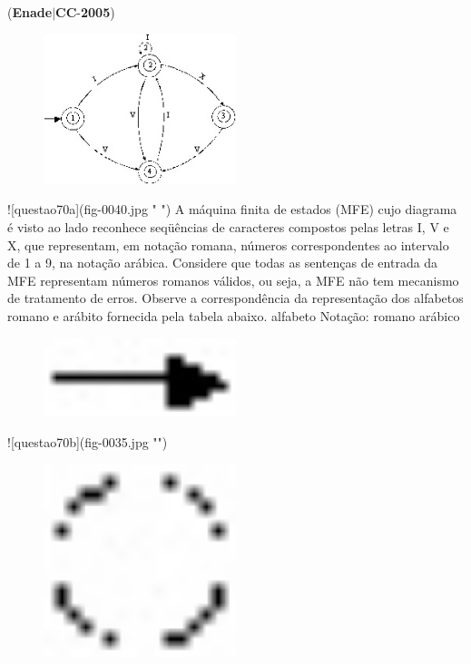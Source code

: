 \documentclass{exam}
\begin{document}
\begin{questions}
\begin{enumerate}[label=\alph*)]
	\end{enumerate}

\question (\textbf{Enade}$|$\textbf{CC}-\textbf{2005}) \begin{figure}[H]
	\begin{center}
		\includegraphics[width=0.5\textwidth]{CIENCIA_DA_COMPUTACAO_Prova2005-utf8_figuras/fig-0040.jpg}
		\caption{ }
	\end{center}
\end{figure}
![questao70a](fig-0040.jpg " ")
A máquina finita de estados (MFE) cujo diagrama é visto ao lado
reconhece seqüências de caracteres compostos pelas letras I, V e X, que
representam, em notação romana, números correspondentes ao intervalo de
1 a 9, na notação arábica. Considere que todas as sentenças de entrada da
MFE representam números romanos válidos, ou seja, a MFE não tem
mecanismo de tratamento de erros. Observe a correspondência da
representação dos alfabetos romano e arábito fornecida pela tabela abaixo.
alfabeto Notação:
romano arábico 
\begin{figure}[H]
	\begin{center}
		\includegraphics[width=0.5\textwidth]{CIENCIA_DA_COMPUTACAO_Prova2005-utf8_figuras/fig-0035.jpg}
		\caption{}
	\end{center}
\end{figure}
![questao70b](fig-0035.jpg "")  
\begin{figure}[H]
	\begin{center}
		\includegraphics[width=0.5\textwidth]{CIENCIA_DA_COMPUTACAO_Prova2005-utf8_figuras/fig-0036.jpg}

\end{center}
\end{figure}
\end{questions}
\end{document}
